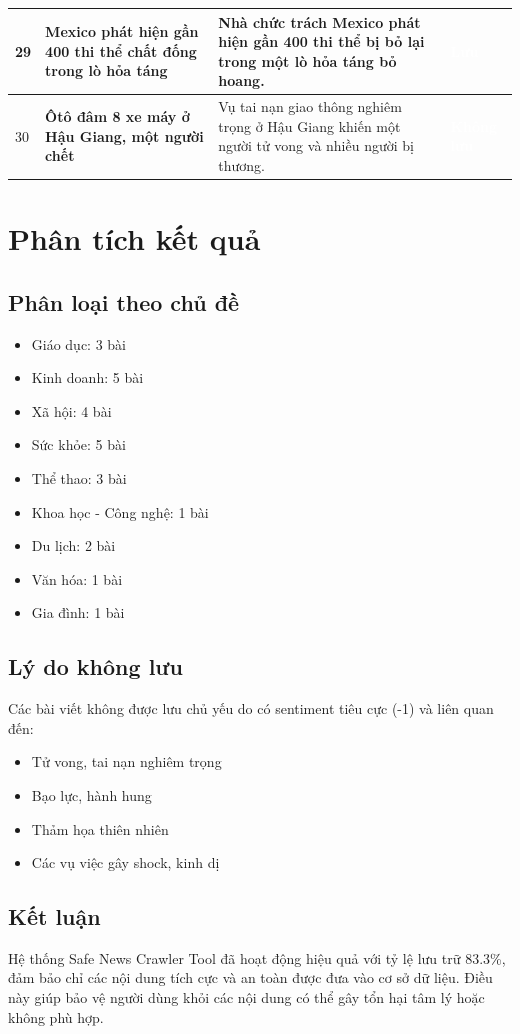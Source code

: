 \documentclass[12pt,a4paper]{article}
\begin{document}
\begin{longtable}{|p{}|L{0.45\textwidth}|L{0.42\textwidth}|p{0.06\textwidth}|}
29 & \textbf{Mexico phát hiện gần 400 thi thể chất đống trong lò hỏa táng}  & Nhà chức trách Mexico phát hiện gần 400 thi thể bị bỏ lại trong một lò hỏa táng bỏ hoang. & \textcolor{white}{\textbf{Lưu}} \\
\hline

30 & \textbf{Ôtô đâm 8 xe máy ở Hậu Giang, một người chết}  & Vụ tai nạn giao thông nghiêm trọng ở Hậu Giang khiến một người tử vong và nhiều người bị thương. & \textcolor{white}{\textbf{Không lưu}} \\
\hline

\end{longtable}

\section{Phân tích kết quả}

\subsection{Phân loại theo chủ đề}
\begin{itemize}
    \item Giáo dục: 3 bài
    \item Kinh doanh: 5 bài  
    \item Xã hội: 4 bài
    \item Sức khỏe: 5 bài
    \item Thể thao: 3 bài
    \item Khoa học - Công nghệ: 1 bài
    \item Du lịch: 2 bài
    \item Văn hóa: 1 bài
    \item Gia đình: 1 bài
\end{itemize}

\subsection{Lý do không lưu}
Các bài viết không được lưu chủ yếu do có sentiment tiêu cực (-1) và liên quan đến:
\begin{itemize}
    \item Tử vong, tai nạn nghiêm trọng
    \item Bạo lực, hành hung
    \item Thảm họa thiên nhiên
    \item Các vụ việc gây shock, kinh dị
\end{itemize}

\subsection{Kết luận}
Hệ thống Safe News Crawler Tool đã hoạt động hiệu quả với tỷ lệ lưu trữ 83.3\%, đảm bảo chỉ các nội dung tích cực và an toàn được đưa vào cơ sở dữ liệu. Điều này giúp bảo vệ người dùng khỏi các nội dung có thể gây tổn hại tâm lý hoặc không phù hợp.
\end{document}

